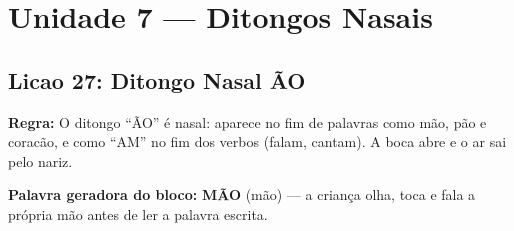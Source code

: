 
\chapter{Unidade 7 --- Ditongos Nasais}

\section{Licao 27: Ditongo Nasal \~AO}

\rotinasimples
{}



\textbf{Regra:} O ditongo ``\~AO'' \'e nasal: aparece no fim de palavras como m\~ao, p\~ao e corac\~ao, e como ``AM'' no fim dos verbos (falam, cantam). A boca abre e o ar sai pelo nariz.

\textbf{Palavra geradora do bloco:} \textbf{M\~AO} (m\~ao) --- a crian\c{c}a olha, toca e fala a pr\'opria m\~ao antes de ler a palavra escrita.

